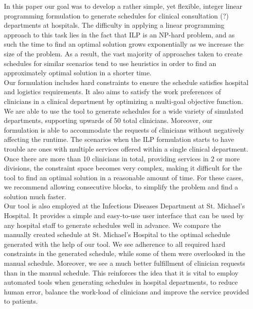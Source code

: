 In this paper our goal was to develop a rather simple, yet flexible, integer linear programming formulation to generate schedules for clinical consultation (?) departments at hospitals. The difficulty in applying a linear programming approach to this task lies in the fact that ILP is an NP-hard problem, and as such the time to find an optimal solution grows exponentially as we increase the size of the problem. As a result, the vast majority of approaches taken to create schedules for similar scenarios tend to use heuristics in order to find an approximately optimal solution in a shorter time. \\

Our formulation includes hard constraints to ensure the schedule satisfies hospital and logistics requirements. It also aims to satisfy the work preferences of clinicians in a clinical department by optimizing a multi-goal objective function. We are able to use the tool to generate schedules for a wide variety of simulated departments, supporting upwards of 50 total clinicians. Moreover, our formulation is able to accommodate the requests of clinicians without negatively affecting the runtime. The scenarios when the ILP formulation starts to have trouble are ones with multiple services offered within a single clinical department. Once there are more than 10 clinicians in total, providing services in 2 or more divisions, the constraint space becomes very complex, making it difficult for the tool to find an optimal solution in a reasonable amount of time. For these cases, we recommend allowing consecutive blocks, to simplify the problem and find a solution much faster. \\

Our tool is also employed at the Infectious Diseases Department at St. Michael's Hospital. It provides a simple and easy-to-use user interface that can be used by any hospital staff to generate schedules well in advance. We compare the manually created schedule at St. Michael's Hospital to the optimal schedule generated with the help of our tool. We see adherence to all required hard constraints in the generated schedule, while some of them were overlooked in the manual schedule. Moreover, we see a much better fulfillment of clinician requests than in the manual schedule. This reinforces the idea that it is vital to employ automated tools when generating schedules in hospital departments, to reduce human error, balance the work-load of clinicians and improve the service provided to patients.
